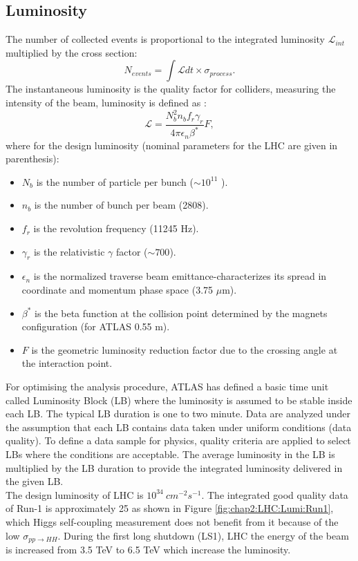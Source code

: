 \subsection{Luminosity}
\label{chap2:LHC:Lumi}
The number of collected events is proportional to the integrated luminosity $\mathcal{L}_{int}$ multiplied by the cross section: 
\begin{equation}
N_{events} = \int\mathcal{L} dt \times \sigma_{process}.
\end{equation}
The instantaneous luminosity is the quality factor for colliders, measuring the intensity of the beam, luminosity is defined as :
\begin{equation}
\mathcal{L} = \frac{N_b^2n_bf_r\gamma_r}{4\pi\epsilon_n\beta^*}F,
\end{equation}
where for the design luminosity (nominal parameters for the LHC are given in parenthesis):
\begin{itemize}
	\item $N_b$ is the number of particle per bunch ($\sim10^{11}$ ).
	\item $n_b$ is the number of bunch per beam (2808).
	\item $f_r$ is the revolution frequency (11245 Hz).
	\item $\gamma_r$ is the relativistic $\gamma$ factor ($\sim 700$).
	\item $\epsilon_n$ is the normalized traverse beam emittance-characterizes its spread in coordinate and momentum phase space (3.75 $\mu$m).
	\item $\beta^*$ is the beta function at the collision point determined by the magnets configuration (for ATLAS 0.55 m).
	\item $F$ is the geometric luminosity reduction factor due to the crossing angle at the interaction point.
\end{itemize}
For optimising the analysis procedure, ATLAS has defined a basic time unit called  Luminosity Block (LB) where the luminosity is assumed to be stable inside each LB. The typical LB duration is one to two minute. Data are analyzed under the assumption that each LB contains data taken under uniform conditions (data quality). To define a data sample for physics, quality criteria are applied to select LBs where the conditions are acceptable. The average luminosity in the LB is multiplied by the LB duration to provide the integrated luminosity delivered in the given LB. \\
The design luminosity of LHC is $10^{34} \ cm^{-2}s^{-1}$. The integrated good quality data of Run-1 is approximately 25 \ifb as shown in Figure \ref{fig:chap2:LHC:Lumi:Run1}, which Higgs self-coupling measurement does not benefit from it because of the low $\sigma_{pp\rightarrow HH}$. During the first long shutdown (LS1), LHC the energy of the beam is increased from 3.5 TeV to 6.5 TeV which increase the luminosity. 
